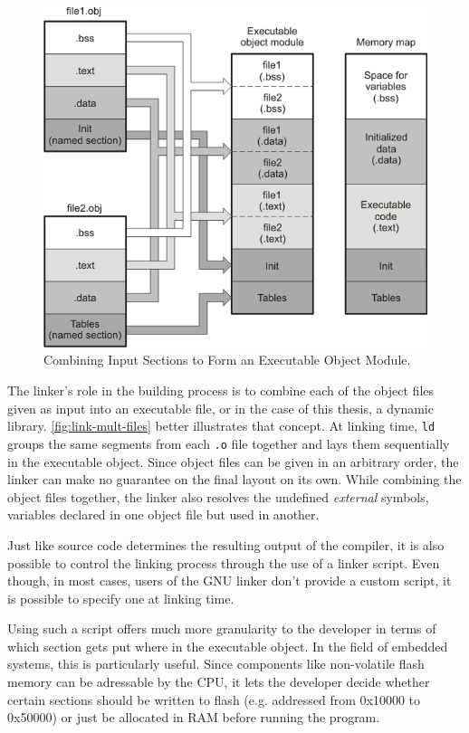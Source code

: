 {\begin{figure}[H]
	\centering 
	\includegraphics[width=.75\linewidth,keepaspectratio]{art/obj-to-elf-to-mem.png}
	\caption{Combining Input Sections to Form an Executable Object Module.\cite{online:linking}}
	\label{fig:link-mult-files}
\end{figure}

The linker's role in the building process is to combine each of the object files given as input into an executable file, or in the case of this thesis, a dynamic library. \autoref{fig:link-mult-files} better illustrates that concept. At linking time, \texttt{ld} groups the same segments from each \texttt{.o} file together and lays them sequentially in the executable object. Since object files can be given in an arbitrary order, the linker can make no guarantee on the final layout on its own. While combining the object files together, the linker also resolves the undefined \textit{external} symbols, variables declared in one object file but used in another. 

Just like source code determines the resulting output of the compiler, it is also possible to control the linking process through the use of a linker script\cite{online:ld-scripts}. Even though, in most cases, users of the GNU linker don't provide a custom script, it is possible to specify one at linking time. 

Using such a script offers much more granularity to the developer in terms of which section gets put where in the executable object. In the field of embedded systems, this is particularly useful. Since components like non-volatile flash memory can be adressable by the CPU\cite{online:flash-ram}, it lets the developer decide whether certain sections should be written to flash (e.g. addressed from 0x10000 to 0x50000) or just be allocated in RAM before running the program.

}
